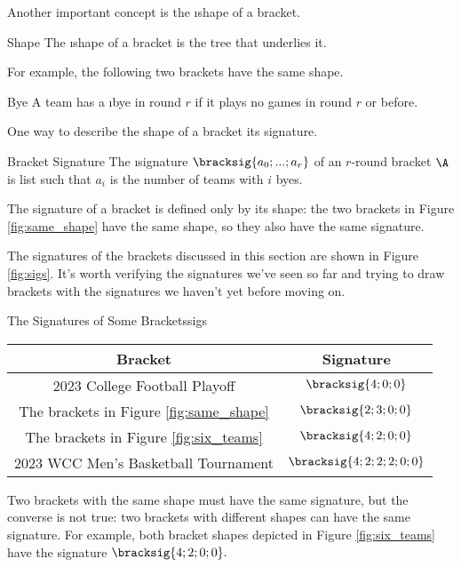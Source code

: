 {Another important concept is the \i{shape} of a bracket.

\begin{definition}{Shape}{}
    The \i{shape} of a bracket is the tree that underlies it.
\end{definition}

For example, the following two brackets have the same shape.


\begin{definition}{Bye}{}
    A team has a \i{bye} in round $r$ if it plays no games in round $r$ or before.
\end{definition}

One way to describe the shape of a bracket its signature.

\begin{definition}{Bracket Signature}{}
    The \i{signature} $\bracksig{a_0; ...; a_r}$ of an $r$-round bracket $\A$ is list such that $a_i$ is the number of teams with $i$ byes.
\end{definition}

The signature of a bracket is defined only by its shape: the two brackets in Figure \ref{fig:same_shape} have the same shape, so they also have the same signature.

The signatures of the brackets discussed in this section are shown in Figure \ref{fig:sigs}. It's worth verifying the signatures we've seen so far and trying to draw brackets with the signatures we haven't yet before moving on.

\begin{figg}{The Signatures of Some Brackets}{sigs}
    \begin{tabular}{ c | c }
         Bracket & Signature \\
         \hline
         2023 College Football Playoff & $\bracksig{4; 0; 0}$ \\
         The brackets in Figure \ref{fig:same_shape} & $\bracksig{2; 3; 0; 0}$\\
         The brackets in Figure \ref{fig:six_teams} & $\bracksig{4; 2; 0; 0}$\\
         2023 WCC Men's Basketball Tournament & $\bracksig{4;2;2;2;0;0}$ \\
    \end{tabular}
\end{figg}

Two brackets with the same shape must have the same signature, but the converse is not true: two brackets with different shapes can have the same signature. For example, both bracket shapes depicted in Figure \ref{fig:six_teams} have the signature $\bracksig{4;2;0;0}.$

}
